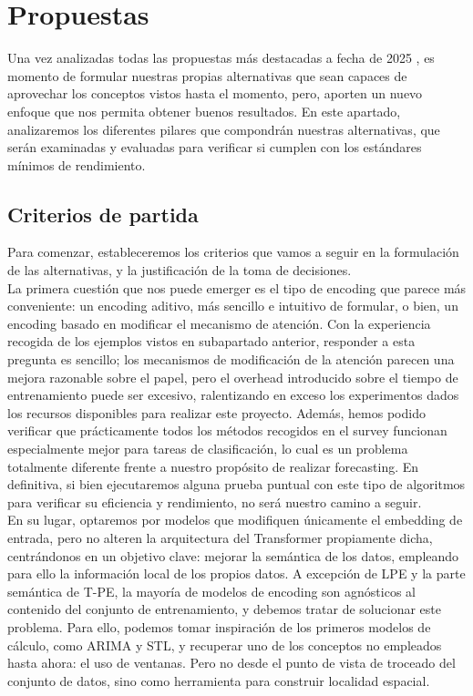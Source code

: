 \section{Propuestas}

Una vez analizadas todas las propuestas más destacadas a fecha de 2025 \cite{irani2025positionalencodingtransformerbasedtime}, es momento de formular nuestras propias alternativas que sean capaces de aprovechar los conceptos vistos hasta el momento, pero, aporten un nuevo enfoque que nos permita obtener buenos resultados. En este apartado, analizaremos los diferentes pilares que compondrán nuestras alternativas, que serán examinadas y evaluadas para verificar si cumplen con los estándares mínimos de rendimiento.

\subsection{Criterios de partida}

Para comenzar, estableceremos los criterios que vamos a seguir en la formulación de las alternativas, y la justificación de la toma de decisiones.\\

La primera cuestión que nos puede emerger es el tipo de encoding que parece más conveniente: un encoding aditivo, más sencillo e intuitivo de formular, o bien, un encoding basado en modificar el mecanismo de atención. Con la experiencia recogida de los ejemplos vistos en subapartado anterior, responder a esta pregunta es sencillo; los mecanismos de modificación de la atención parecen una mejora razonable sobre el papel, pero el overhead introducido sobre el tiempo de entrenamiento puede ser excesivo, ralentizando en exceso los experimentos dados los recursos disponibles para realizar este proyecto. Además, hemos podido verificar que prácticamente todos los métodos recogidos en el survey funcionan especialmente mejor para tareas de clasificación, lo cual es un problema totalmente diferente frente a nuestro propósito de realizar forecasting. En definitiva, si bien ejecutaremos alguna prueba puntual con este tipo de algoritmos para verificar su eficiencia y rendimiento, no será nuestro camino a seguir.\\

En su lugar, optaremos por modelos que modifiquen únicamente el embedding de entrada, pero no alteren la arquitectura del Transformer propiamente dicha, centrándonos en un objetivo clave: mejorar la semántica de los datos, empleando para ello la información local de los propios datos. A excepción de LPE y la parte semántica de T-PE, la mayoría de modelos de encoding son agnósticos al contenido del conjunto de entrenamiento, y debemos tratar de solucionar este problema. Para ello, podemos tomar inspiración de los primeros modelos de cálculo, como ARIMA y STL, y recuperar uno de los conceptos no empleados hasta ahora: el uso de ventanas. Pero no desde el punto de vista de troceado del conjunto de datos, sino como herramienta para construir localidad espacial.\\

